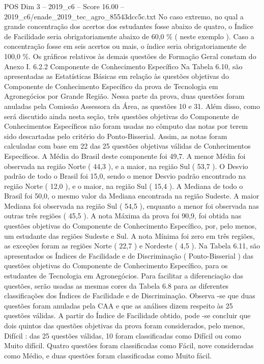 \begin{textsample}{POS Dim 3 – 2019\_c6 – Score 16.00 – 2019\_c6/enade\_2019\_tec\_agro\_85543dcc5c.txt}
No caso extremo, no qual a grande concentração dos acertos dos estudantes fosse abaixo de quatro, o Índice de Facilidade seria obrigatoriamente abaixo de 60,0 \% ( neste exemplo ).
Caso a concentração fosse em seis acertos ou mais, o índice seria obrigatoriamente de 100,0 \%.
Os gráficos relativos às demais questões de Formação Geral constam do Anexo I. 6.2.2 Componente de Conhecimento Específico Na Tabela 6.10, são apresentadas as Estatísticas Básicas em relação às questões objetivas do Componente de Conhecimento Específico da prova de Tecnologia em Agronegócios por Grande Região.
Nessa parte da prova, duas questões foram anuladas pela Comissão Assessora da Área, as questões 10 e 31.
Além disso, como será discutido ainda nesta seção, três questões objetivas do Componente de Conhecimentos Específicos não foram usadas no cômputo das notas por terem sido descartadas pelo critério do Ponto-Bisserial.
Assim, as notas foram calculadas com base em 22 das 25 questões objetivas válidas de Conhecimentos Específicos.
A Média do Brasil deste componente foi 49,7.
A menor Média foi observada na região Norte ( 44,3 ), e a maior, na região Sul ( 53,7 ).
O Desvio padrão de todo o Brasil foi 15,0, sendo o menor Desvio padrão encontrado na região Norte ( 12,0 ), e o maior, na região Sul ( 15,4 ).
A Mediana de todo o Brasil foi 50,0, o mesmo valor da Mediana encontrada na região Sudeste.
A maior Mediana foi observada na região Sul ( 54,5 ), enquanto a menor foi observada nas outras três regiões ( 45,5 ).
A nota Máxima da prova foi 90,9, foi obtida nas questões objetivas do Componente de Conhecimento Específico, por, pelo menos, um estudante das regiões Sudeste e Sul.
A nota Mínima foi zero em três regiões, as exceções foram as regiões Norte ( 22,7 ) e Nordeste ( 4,5 ).
Na Tabela 6.11, são apresentados os Índices de Facilidade e de Discriminação ( Ponto-Bisserial ) das questões objetivas do Componente de Conhecimento Específico, para os estudantes de Tecnologia em Agronegócios.
Para facilitar a diferenciação das questões, serão usadas as mesmas cores da Tabela 6.8 para as diferentes classificações dos Índices de Facilidade e de Discriminação.
Observa -se que duas questões foram anuladas pela CAA e que as análises dizem respeito às 25 questões válidas.
A partir do Índice de Facilidade obtido, pode -se concluir que dois quintos das questões objetivas da prova foram considerados, pelo menos, Difícil : das 25 questões válidas, 10 foram classificadas como Difícil ou como Muito difícil.
Quatro questões foram classificadas como Fácil, nove consideradas como Médio, e duas questões foram classificadas como Muito fácil.

\end{textsample}
